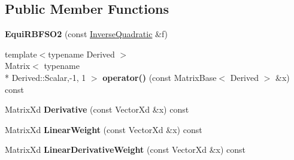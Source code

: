 \subsection*{Public Member Functions}
\begin{DoxyCompactItemize}
\item 
\hypertarget{struct_d_r_d_s_p_1_1_equi_r_b_f_s_o2_3_01_inverse_quadratic_01_4_a515e457f292cf8e579f0ff68d47dbba1}{{\bfseries Equi\-R\-B\-F\-S\-O2} (const \hyperlink{struct_d_r_d_s_p_1_1_inverse_quadratic}{Inverse\-Quadratic} \&f)}\label{struct_d_r_d_s_p_1_1_equi_r_b_f_s_o2_3_01_inverse_quadratic_01_4_a515e457f292cf8e579f0ff68d47dbba1}

\item 
\hypertarget{struct_d_r_d_s_p_1_1_equi_r_b_f_s_o2_3_01_inverse_quadratic_01_4_a691663e6181d3ba09ec25235562015f8}{{\footnotesize template$<$typename Derived $>$ }\\Matrix$<$ typename \\*
Derived\-::\-Scalar,-\/1, 1 $>$ {\bfseries operator()} (const Matrix\-Base$<$ Derived $>$ \&x) const }\label{struct_d_r_d_s_p_1_1_equi_r_b_f_s_o2_3_01_inverse_quadratic_01_4_a691663e6181d3ba09ec25235562015f8}

\item 
\hypertarget{struct_d_r_d_s_p_1_1_equi_r_b_f_s_o2_3_01_inverse_quadratic_01_4_a5b0fc83d15864289fd58d6ac60deb635}{Matrix\-Xd {\bfseries Derivative} (const Vector\-Xd \&x) const }\label{struct_d_r_d_s_p_1_1_equi_r_b_f_s_o2_3_01_inverse_quadratic_01_4_a5b0fc83d15864289fd58d6ac60deb635}

\item 
\hypertarget{struct_d_r_d_s_p_1_1_equi_r_b_f_s_o2_3_01_inverse_quadratic_01_4_aced0ccd45028df75780a1ba776da9fc9}{Matrix\-Xd {\bfseries Linear\-Weight} (const Vector\-Xd \&x) const }\label{struct_d_r_d_s_p_1_1_equi_r_b_f_s_o2_3_01_inverse_quadratic_01_4_aced0ccd45028df75780a1ba776da9fc9}

\item 
\hypertarget{struct_d_r_d_s_p_1_1_equi_r_b_f_s_o2_3_01_inverse_quadratic_01_4_a1948467b9230ee7bce761028f4b0af06}{Matrix\-Xd {\bfseries Linear\-Derivative\-Weight} (const Vector\-Xd \&x) const }\label{struct_d_r_d_s_p_1_1_equi_r_b_f_s_o2_3_01_inverse_quadratic_01_4_a1948467b9230ee7bce761028f4b0af06}

\end{DoxyCompactItemize}

